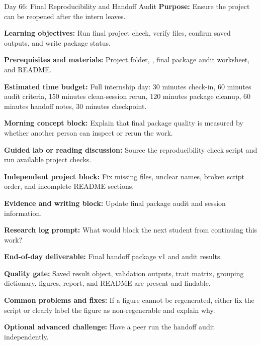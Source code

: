 \begin{dailybox}{Day 66: Final Reproducibility and Handoff Audit}
\textbf{Purpose:} Ensure the project can be reopened after the intern leaves.

\textbf{Learning objectives:} Run final project check, verify files, confirm saved outputs, and write package status.

\textbf{Prerequisites and materials:} Project folder, , final package audit worksheet, and README.

\textbf{Estimated time budget:} Full internship day: 30 minutes check-in, 60 minutes audit criteria, 150 minutes clean-session rerun, 120 minutes package cleanup, 60 minutes handoff notes, 30 minutes checkpoint.

\textbf{Morning concept block:} Explain that final package quality is measured by whether another person can inspect or rerun the work.

\textbf{Guided lab or reading discussion:} Source the reproducibility check script and run available project checks.

\textbf{Independent project block:} Fix missing files, unclear names, broken script order, and incomplete README sections.

\textbf{Evidence and writing block:} Update final package audit and session information.

\textbf{Research log prompt:} What would block the next student from continuing this work?

\textbf{End-of-day deliverable:} Final handoff package v1 and audit results.

\textbf{Quality gate:} Saved result object, validation outputs, trait matrix, grouping dictionary, figures, report, and README are present and findable.

\textbf{Common problems and fixes:} If a figure cannot be regenerated, either fix the script or clearly label the figure as non-regenerable and explain why.

\textbf{Optional advanced challenge:} Have a peer run the handoff audit independently.
\end{dailybox}

